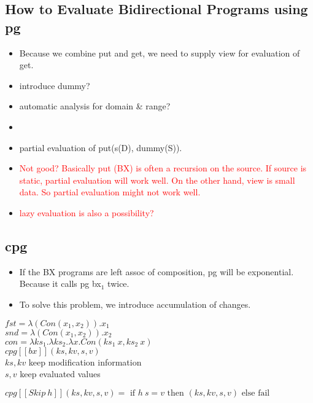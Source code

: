 \documentclass[runningheads]{llncs}
\newcommand{\tab}{\hspace*{5mm}}
\newcommand{\cpg}[5]{cpg [\![#1]\!] (#2, #3, #4, #5)}
\begin{document}
\subsection{How to Evaluate Bidirectional Programs using pg}

\begin{itemize}
\item Because we combine put and get, we need to supply view for evaluation of get.
\item introduce dummy?
\item automatic analysis for domain \& range?
\item 
\item partial evaluation of put(s(D), dummy(S)).
\item \textcolor{red}{Not good? Basically put (BX) is often a recursion on the source. If source is static, partial evaluation will work well. On the other hand, view is small data. So partial evaluation might not work well.}
\item \textcolor{red}{lazy evaluation is also a possibility?}
\end{itemize}

\subsection{cpg}

\begin{itemize}
\item If the BX programs are left assoc of composition, pg will be exponential. Because it calls pg bx$_1$ twice.
\item To solve this problem, we introduce accumulation of changes.
\end{itemize}

$fst = \lambda (Con (x_1, x_2)). x_1$\\
$snd = \lambda (Con (x_1, x_2)). x_2$\\
$con = \lambda ks_1. \lambda ks_2. \lambda x. Con(ks_1 \ x, ks_2 \ x)$\\

$\cpg{bx}{ks}{kv}{s}{v}$ \\
    \tab $ks, kv$ keep modification information\\
    \tab $s, v$ keep evaluated values\\

\vspace{3mm}

$\cpg{Skip \ h}{ks}{kv}{s}{v} = \text{ if } h \ s = v \text{ then } (ks, kv, s, v) \text{ else fail}$\\
\end{document}
